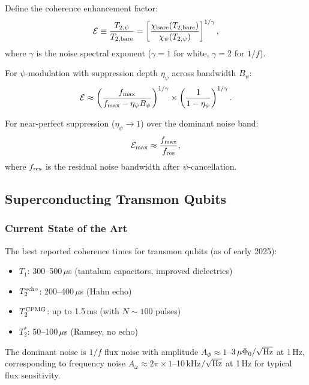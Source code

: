 \documentclass[aps,prd,twocolumn,superscriptaddress,nofootinbib]{revtex4-2}
\begin{document}
Define the coherence enhancement factor:
\begin{equation}\label{eq:enhancement}
\mathcal{E} \equiv \frac{T_{2,\psi}}{T_{2,\rm bare}} =
\left[\frac{\chi_{\rm bare}(T_{2,\rm bare})}
{\chi_\psi(T_{2,\psi})}\right]^{1/\gamma},
\end{equation}
where $\gamma$ is the noise spectral exponent ($\gamma = 1$ for white,
$\gamma = 2$ for $1/f$).

For $\psi$-modulation with suppression depth $\eta_\psi$ across
bandwidth $B_\psi$:
\begin{equation}\label{eq:enhancement-approx}
\mathcal{E} \approx \left(\frac{f_{\rm max}}{f_{\rm max} - \eta_\psi B_\psi}\right)^{1/\gamma}
\times \left(\frac{1}{1 - \eta_\psi}\right)^{1/\gamma}.
\end{equation}

For near-perfect suppression ($\eta_\psi \to 1$) over the dominant noise
band:
\begin{equation}
\mathcal{E}_{\rm max} \approx \frac{f_{\rm max}}{f_{\rm res}},
\end{equation}
where $f_{\rm res}$ is the residual noise bandwidth after $\psi$-cancellation.

\subsection{Superconducting Transmon Qubits}

\subsubsection{Current State of the Art}

The best reported coherence times for transmon qubits (as of early 2025):
\begin{itemize}
\item $T_1$: 300--500\,$\mu$s (tantalum capacitors, improved dielectrics)
\item $T_2^{\rm echo}$: 200--400\,$\mu$s (Hahn echo)
\item $T_2^{\rm CPMG}$: up to 1.5\,ms (with $N \sim 100$ pulses)
\item $T_2^{*}$: 50--100\,$\mu$s (Ramsey, no echo)
\end{itemize}

The dominant noise is $1/f$ flux noise with amplitude
$A_\Phi \approx 1$--$3\,\mu\Phi_0/\sqrt{\rm Hz}$ at 1\,Hz, corresponding
to frequency noise $A_\omega \approx 2\pi \times 1$--10\,kHz$/\sqrt{\rm Hz}$
at 1\,Hz for typical flux sensitivity.
\end{document}
